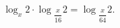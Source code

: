 \begin{ex}[type=equation]
	\begin{condition}
		$\log_x 2\cdot\log$\tiny$_{\dfrac{x}{16}}$\normalsize$2 =\log$\tiny$_{\dfrac{x}{64}}$\normalsize$2.$
	\end{condition}
\end{ex}